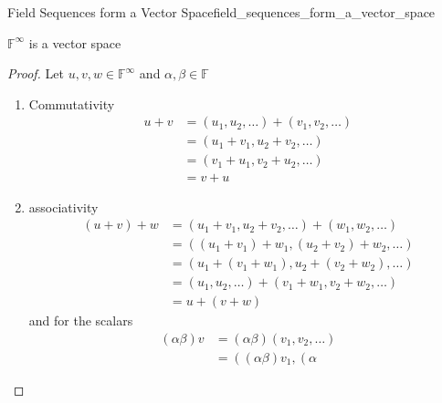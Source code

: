 \begin{proposition}{Field Sequences form a Vector Space}{field_sequences_form_a_vector_space}
    \begin{center}
        \( \mathbb{F} ^{ \infty  }  \) is a vector space
    \end{center}
\end{proposition}
\begin{proof}
Let \( u, v, w \in  \mathbb{F} ^{ \infty  }  \) and \( \alpha , \beta \in \mathbb{F} \) 
\begin{enumerate}
    \item Commutativity
        \begin{align*}
            u +  v &= \left( u _{ 1 } , u _{ 2 } , \ldots \right) + \left( v _{
            1 } , v _{ 2 } , \ldots \right) \\
                   &= \left( u _{ 1 }  +  v _{ 1 } , u _{ 2 }  +  v _{ 2 } ,
                   \ldots \right) \\
                   &= \left( v _{ 1 }  +  u _{ 1 } , v _{ 2 }  +  u _{ 2 } ,
                   \ldots \right) \\
                   &=  v +  u
        \end{align*}
    \item associativity
        \begin{align*}
           \left( u +  v \right) +  w   &= \left( u _{ 1 }  +  v _{ 1 } , u _{ 2
           }  +  v _{ 2 } , \ldots \right) +  \left( w _{ 1 } , w _{ 2 } ,
           \ldots \right) \\
           &= \left( \left( u _{ 1 }  +  v _{ 1 } \right)  +  w _{ 1 }  , \left(  u
           _{ 2 }  +  v _{ 2 } \right)  +  w _{ 2 }  , \ldots \right)\\
           &= \left(  u _{ 1 }  + \left( v _{ 1 }   +  w _{ 1 }\right)  ,   u
           _{ 2 }  +  \left( v _{ 2 }   +  w _{ 2 } \right)  , \ldots \right)\\
           &= \left( u _{ 1 } , u _{ 2 } , \ldots \right) +  \left( v _{ 1 }  +
           w _{ 1 } , v _{ 2 }  +  w _{ 2 } , \ldots \right)\\
           &=  u +  \left( v +  w \right) 
        \end{align*}
        and for the scalars
        \begin{align*}
            \left( \alpha \beta  \right) v &= \left( \alpha \beta  \right)
            \left( v _{ 1 } , v _{ 2 } , \ldots \right) \\
            &=  \left( \left( \alpha \beta \right) v _{ 1 } , \left( \alpha

\end{align*}
\end{enumerate}
\end{proof}
